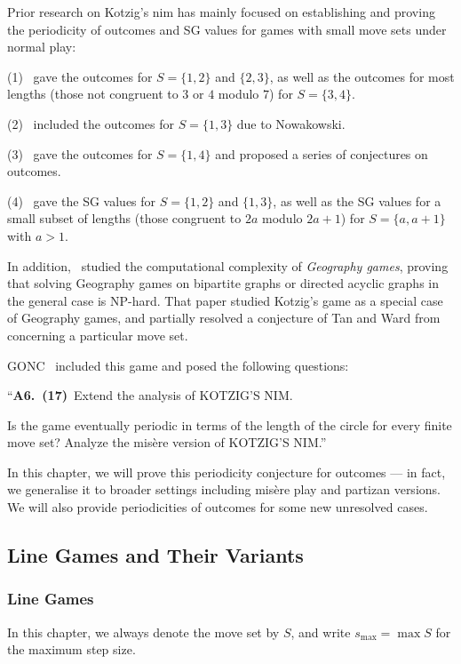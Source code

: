 \documentclass[11pt]{article}
\theoremstyle{definition}
\theoremstyle{plain}
\begin{document}
Prior research on Kotzig's nim has mainly focused on establishing and proving the periodicity of outcomes and SG values for games with small move sets under normal play:

(1)~\cite{Kotzig1995} gave the outcomes for $S=\{1, 2\}$ and $\{2, 3\}$, as well as the outcomes for most lengths (those not congruent to $3$ or $4$ modulo $7$) for $S=\{3, 4\}$.

(2)~\cite{Kotzig2005} included the outcomes for $S=\{1, 3\}$ due to Nowakowski.

(3)~\cite{Kotzig2014} gave the outcomes for $S=\{1, 4\}$ and proposed a series of conjectures on outcomes.

(4)~\cite{Kotzig2019} gave the SG values for $S=\{1, 2\}$ and $\{1, 3\}$, as well as the SG values for a small subset of lengths (those congruent to $2a$ modulo $2a+1$) for $S=\{a, a+1\}$ with $a>1$.

In addition,~\cite{Kotzig2025} studied the computational complexity of \textit{Geography games}, proving that solving Geography games on bipartite graphs or directed acyclic graphs in the general case is NP-hard.
That paper studied Kotzig's game as a special case of Geography games, and partially resolved a conjecture of Tan and Ward from~\cite{Kotzig2014} concerning a particular move set.

GONC~\cite{GONC} included this game and posed the following questions:

``\textbf{A6.~(17)}~Extend the analysis of KOTZIG'S NIM.

    Is the game eventually periodic in terms of the length of the circle for every finite move set?
    Analyze the misère version of KOTZIG'S NIM.''

In this chapter, we will prove this periodicity conjecture for outcomes — in fact, we generalise it to broader settings including misère play and partizan versions.
We will also provide periodicities of outcomes for some new unresolved cases.

\subsection{Line Games and Their Variants}

\subsubsection{Line Games}

In this chapter, we always denote the move set by $S$, and write $s_{\max}=\max S$ for the maximum step size.
\end{document}
